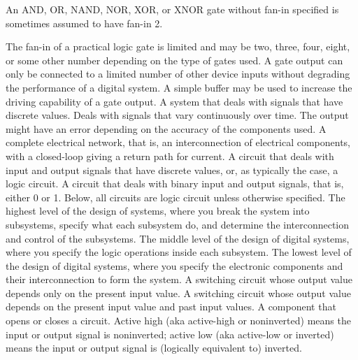 \documentclass[a4paper,12pt]{report}
\begin{document}
An AND, OR, NAND, NOR, XOR, or XNOR gate without fan-in specified is sometimes assumed to have fan-in 2.

The fan-in of a practical logic gate is limited and may be two, three, four, eight, or some other number depending on the type of gates used.
A gate output can only be connected to a limited number of other device inputs without degrading the performance of a digital system. A simple buffer may be used to increase the driving capability of a gate output.
A system that deals with signals that have discrete values.
Deals with signals that vary continuously over time. The output might have an error depending on the accuracy of the components used.
A complete electrical network, that is, an interconnection of electrical components, with a closed-loop giving a return path for current.
A circuit that deals with input and output signals that have discrete values, or, as typically the case, a logic circuit.
A circuit that deals with binary input and output signals, that is, either 0 or 1. Below, all circuits are logic circuit unless otherwise specified.
The highest level of the design of systems, where you break the system into subsystems, specify what each subsystem do, and determine the interconnection and control of the subsystems.
The middle level of the design of digital systems, where you specify the logic operations inside each subsystem.
The lowest level of the design of digital systems, where you specify the electronic components and their interconnection to form the system.
A switching circuit whose output value depends only on the present input value.
A switching circuit whose output value depends on the present input value and past input values.
A component that opens or closes a circuit.
Active high (aka active-high or noninverted) means the input or output signal is noninverted; active low (aka active-low or inverted) means the input or output signal is (logically equivalent to) inverted.
\end{document}

